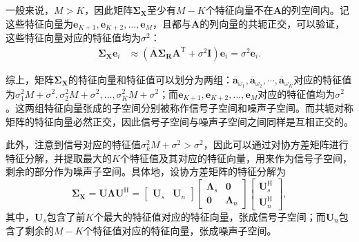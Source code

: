 一般来说，\( M > K \)，因此矩阵\( \mathbf{\Sigma}_{\mathbf{X}} \)至少有\( M-K \)个特征向量不在\( \mathbf{A} \)的列空间内。记这些特征向量为\( \bm{e}_{K+1}, \bm{e}_{K+2}, \ldots, \bm{e}_M \)，且都与\( \mathbf{A} \)的列向量的共轭正交，可以验证，这些特征向量对应的特征值均为\( \sigma^2 \)：
\[
    \begin{split}
        \mathbf{\Sigma}_{\mathbf{X}} \bm{e}_i
         & \approx \left( \overline{\mathbf{A}} \mathbf{\Sigma}_{\mathbf{R}} \mathbf{A}^{\mathrm{T}} + \sigma^2 \mathbf{I} \right) \bm{e}_i
        = \sigma^2 \bm{e}_i.
    \end{split}
\]

综上，矩阵\( \mathbf{\Sigma}_{\mathbf{X}} \)的特征向量和特征值可以划分为两组：\( \overline{\bm{a}}_{\omega_1}, \overline{\bm{a}}_{\omega_2}, \cdots, \overline{\bm{a}}_{\omega_K} \)对应的特征值为\( \sigma_1^2 M + \sigma^2, \sigma_2^2 M + \sigma^2, \ldots, \sigma_K^2 M + \sigma^2 \)；而\( \bm{e}_{K+1}, \bm{e}_{K+2}, \ldots, \bm{e}_M \)对应的特征值均为\( \sigma^2 \)。这两组特征向量张成的子空间分别被称作信号子空间和噪声子空间。而共轭对称矩阵的特征向量必然正交，因此信号子空间与噪声子空间之间同样是互相正交的。

此外，注意到信号对应的特征值\( \sigma^2_k M + \sigma^2 > \sigma^2 \)，因此可以通过对协方差矩阵进行特征分解，并提取最大的\( K \)个特征值及其对应的特征向量，用来作为信号子空间，剩余的部分作为噪声子空间。具体地，设协方差矩阵的特征分解为
\[
    \mathbf{\Sigma}_{\mathbf{X}} = \mathbf{U} \mathbf{\Lambda} \mathbf{U}^{\mathrm{H}} = \begin{bmatrix}
        \mathbf{U}_{s} & \mathbf{U}_{n}
    \end{bmatrix} \begin{bmatrix}
        \mathbf{\Lambda}_{s} & \mathbf{0}           \\
        \mathbf{0}           & \mathbf{\Lambda}_{n}
    \end{bmatrix} \begin{bmatrix}
        \mathbf{U}_{s}^{\mathrm{H}} \\
        \mathbf{U}_{n}^{\mathrm{H}}
    \end{bmatrix},
\]
其中，\( \mathbf{U}_{s} \)包含了前\( K \)个最大的特征值对应的特征向量，张成信号子空间；而\( \mathbf{U}_{n} \)包含了剩余的\( M-K \)个特征值对应的特征向量，张成噪声子空间。

